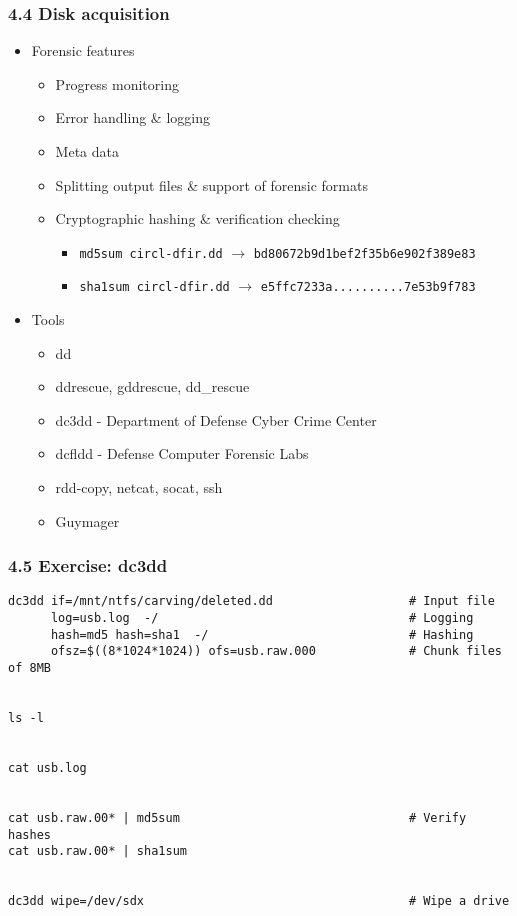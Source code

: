 \begin{frame}[fragile]
  \frametitle{4.4 Disk acquisition}
    \begin{itemize}
        \item Forensic features
        \begin{itemize}
            \item Progress monitoring
            \item Error handling \& logging
            \item Meta data
            \item Splitting output files \& support of forensic formats
            \item Cryptographic hashing \& verification checking
            \begin{itemize}
                \item[] \texttt{md5sum circl-dfir.dd} $\to$ \texttt{bd80672b9d1bef2f35b6e902f389e83}
                \item[] \texttt{sha1sum circl-dfir.dd} $\to$ \texttt{e5ffc7233a..........7e53b9f783}
            \end{itemize}
        \end{itemize}
        \item Tools
        \begin{itemize}
            \item dd
            \item ddrescue, gddrescue, dd\_rescue
            \item dc3dd - Department of Defense Cyber Crime Center
            \item dcfldd - Defense Computer Forensic Labs
	    \item rdd-copy, netcat, socat, ssh
            \item Guymager
        \end{itemize}
    \end{itemize}
\end{frame}


\begin{frame}[fragile]
  \frametitle{4.5 Exercise: dc3dd}
  \begin{lstlisting}[basicstyle=\tiny]
dc3dd if=/mnt/ntfs/carving/deleted.dd                   # Input file
      log=usb.log  -/                                   # Logging
      hash=md5 hash=sha1  -/                            # Hashing
      ofsz=$((8*1024*1024)) ofs=usb.raw.000             # Chunk files of 8MB


ls -l


cat usb.log


cat usb.raw.00* | md5sum                                # Verify hashes
cat usb.raw.00* | sha1sum


dc3dd wipe=/dev/sdx                                     # Wipe a drive
  \end{lstlisting}
\end{frame}


